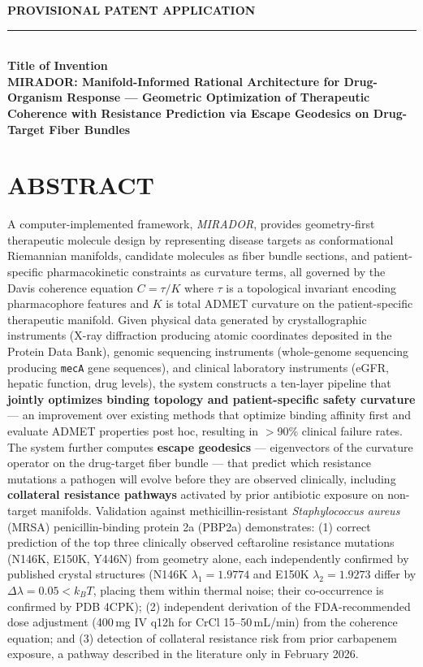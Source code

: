 \documentclass[11pt]{article}
\newcommand{\InventionTitle}{MIRADOR: Manifold-Informed Rational Architecture for Drug-Organism Response — Geometric Optimization of Therapeutic Coherence with Resistance Prediction via Escape Geodesics on Drug-Target Fiber Bundles}
\begin{document}
\thispagestyle{fancy}

\begin{center}
{\Large\bfseries PROVISIONAL PATENT APPLICATION}\\[0.75ex]
\rule{0.8\linewidth}{0.4pt}\\[1.0ex]
{\large\bfseries Title of Invention}\\[0.5ex]
\textbf{\InventionTitle}\\[1.25ex]
\end{center}

\section*{ABSTRACT}

A computer-implemented framework, \emph{MIRADOR}, provides geometry-first therapeutic molecule design by representing disease targets as conformational Riemannian manifolds, candidate molecules as fiber bundle sections, and patient-specific pharmacokinetic constraints as curvature terms, all governed by the Davis coherence equation $C = \tau/K$ where $\tau$ is a topological invariant encoding pharmacophore features and $K$ is total ADMET curvature on the patient-specific therapeutic manifold. Given physical data generated by crystallographic instruments (X-ray diffraction producing atomic coordinates deposited in the Protein Data Bank), genomic sequencing instruments (whole-genome sequencing producing \texttt{mecA} gene sequences), and clinical laboratory instruments (eGFR, hepatic function, drug levels), the system constructs a ten-layer pipeline that \textbf{jointly optimizes binding topology and patient-specific safety curvature} — an improvement over existing methods that optimize binding affinity first and evaluate ADMET properties post hoc, resulting in $>$90\% clinical failure rates. The system further computes \textbf{escape geodesics} — eigenvectors of the curvature operator on the drug-target fiber bundle — that predict which resistance mutations a pathogen will evolve before they are observed clinically, including \textbf{collateral resistance pathways} activated by prior antibiotic exposure on non-target manifolds. Validation against methicillin-resistant \textit{Staphylococcus aureus} (MRSA) penicillin-binding protein 2a (PBP2a) demonstrates: (1) correct prediction of the top three clinically observed ceftaroline resistance mutations (N146K, E150K, Y446N) from geometry alone, each independently confirmed by published crystal structures (N146K $\lambda_1 = 1.9774$ and E150K $\lambda_2 = 1.9273$ differ by $\Delta\lambda = 0.05 < k_BT$, placing them within thermal noise; their co-occurrence is confirmed by PDB 4CPK); (2) independent derivation of the FDA-recommended dose adjustment (400\,mg IV q12h for CrCl 15--50\,mL/min) from the coherence equation; and (3) detection of collateral resistance risk from prior carbapenem exposure, a pathway described in the literature only in February 2026.
\end{document}
